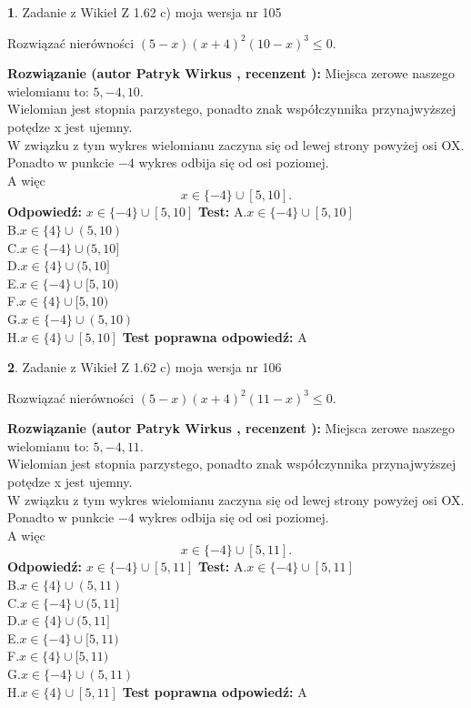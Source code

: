 \documentclass[12pt, a4paper]{article}
\theoremstyle{definition} %
\newtheorem{zad}{}
\newcommand{\zadStart}[1]{\begin{zad}#1\newline}
\newcommand{\zadStop}{\end{zad}}
\newcommand{\rozwStart}[2]{\noindent \textbf{Rozwiązanie (autor #1 , recenzent #2): }\newline}
\newcommand{\rozwStop}{\newline}
\newcommand{\odpStart}{\noindent \textbf{Odpowiedź:}\newline}
\newcommand{\odpStop}{\newline}
\newcommand{\testStart}{\noindent \textbf{Test:}\newline}
\newcommand{\testStop}{\newline}
\newcommand{\kluczStart}{\noindent \textbf{Test poprawna odpowiedź:}\newline}
\newcommand{\kluczStop}{\newline}
\begin{document}
\zadStart{Zadanie z Wikieł Z 1.62 c) moja wersja nr 105}

Rozwiązać nierówności $(5-x)(x+4)^{2}(10-x)^{3}\le0$.
\zadStop
\rozwStart{Patryk Wirkus}{}
Miejsca zerowe naszego wielomianu to: $5, -4, 10$.\\
Wielomian jest stopnia parzystego, ponadto znak współczynnika przy\linebreak najwyższej potędze x jest ujemny.\\ W związku z tym wykres wielomianu zaczyna się od lewej strony powyżej osi OX.\\
Ponadto w punkcie $-4$ wykres odbija się od osi poziomej.\\
A więc $$x \in \{-4\} \cup [5,10].$$
\rozwStop
\odpStart
$x \in \{-4\} \cup [5,10]$
\odpStop
\testStart
A.$x \in \{-4\} \cup [5,10]$\\
B.$x \in \{4\} \cup (5,10)$\\
C.$x \in \{-4\} \cup (5,10]$\\
D.$x \in \{4\} \cup (5,10]$\\
E.$x \in \{-4\} \cup [5,10)$\\
F.$x \in \{4\} \cup [5,10)$\\
G.$x \in \{-4\} \cup (5,10)$\\
H.$x \in \{4\} \cup [5,10]$
\testStop
\kluczStart
A
\kluczStop



\zadStart{Zadanie z Wikieł Z 1.62 c) moja wersja nr 106}

Rozwiązać nierówności $(5-x)(x+4)^{2}(11-x)^{3}\le0$.
\zadStop
\rozwStart{Patryk Wirkus}{}
Miejsca zerowe naszego wielomianu to: $5, -4, 11$.\\
Wielomian jest stopnia parzystego, ponadto znak współczynnika przy\linebreak najwyższej potędze x jest ujemny.\\ W związku z tym wykres wielomianu zaczyna się od lewej strony powyżej osi OX.\\
Ponadto w punkcie $-4$ wykres odbija się od osi poziomej.\\
A więc $$x \in \{-4\} \cup [5,11].$$
\rozwStop
\odpStart
$x \in \{-4\} \cup [5,11]$
\odpStop
\testStart
A.$x \in \{-4\} \cup [5,11]$\\
B.$x \in \{4\} \cup (5,11)$\\
C.$x \in \{-4\} \cup (5,11]$\\
D.$x \in \{4\} \cup (5,11]$\\
E.$x \in \{-4\} \cup [5,11)$\\
F.$x \in \{4\} \cup [5,11)$\\
G.$x \in \{-4\} \cup (5,11)$\\
H.$x \in \{4\} \cup [5,11]$
\testStop
\kluczStart
A
\kluczStop
\end{document}
